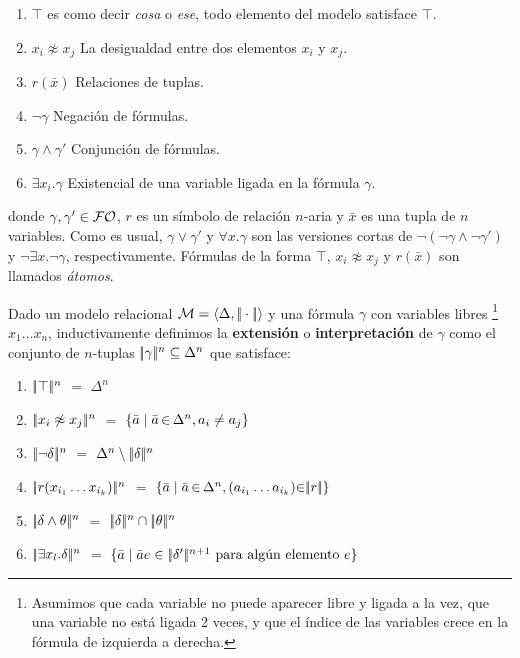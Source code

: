 \medskip

\begin{enumerate}
  \item $\top$ es como decir {\it cosa} o \emph{ese}, todo elemento del modelo satisface $\top$.
  \item $x_i \not\approx x_j$ La desigualdad entre dos elementos $x_i$ y $x_j$.
  \item $r (\bar x)$ Relaciones de tuplas.
  \item $\lnot \gamma$ Negaci\'on de f\'ormulas.
  \item $\gamma \land \gamma'$ Conjunci\'on de f\'ormulas.
  \item $\exists x_i . \gamma$ Existencial de una variable ligada en la f\'ormula $\gamma$.
\end{enumerate}
%
donde $\gamma,\gamma' \in \mathcal{FO}$,
$r$ es un s\'imbolo de relaci\'on $n$-aria y $\bar x$ es una tupla de $n$ variables.
Como es usual, $\gamma \lor \gamma'$ y $\forall x . \gamma$ son las versiones cortas de
$\lnot(\lnot\gamma \land \lnot\gamma')$ y $\lnot\exists x . \lnot\gamma$, respectivamente.
F\'ormulas de la forma $\top$, $x_i \not\approx x_j$ y $r(\bar
x)$ son llamados \emph{\'atomos}.%

Dado un modelo relacional $\mathcal{M} = \langle \Delta,|\!|\cdot|\!| \rangle$ y una
f\'ormula $\gamma$ con variables libres%
\footnote{%
    Asumimos que cada variable no puede aparecer libre y ligada a la vez, que una variable no est\'a ligada 2 veces,
    y que el \'indice de las variables crece en la f\'ormula de izquierda a derecha.%
}
$x_1\ldots x_n$, inductivamente definimos la \textbf{extensi\'on} o
\textbf{interpretaci\'on} de $\gamma$ como el conjunto de $n$-tuplas
 $|\!|\gamma|\!|^n \subseteq \Delta^n$ que satisface:

\begin{enumerate}

\item $|\!|\top|\!|^n$ $=$ $\Delta^n$

\item $|\!|x_i \not\approx x_j|\!|^n$ $=$ $\{\bar{a} \mid \bar{a} \,{\in}\, \Delta^n, a_i \neq a_j\}$

\item $|\!|\lnot\delta|\!|^n$ $=$ $\Delta^n \setminus |\!|\delta|\!|^n$

\item $|\!|r (x_{i_1} \ldots x_{i_k})|\!|^n$ $=$ $\{\bar{a} \mid \bar{a} \,{\in}\, \Delta^n, (a_{i_1} \ldots a_{i_k}) {\in} |\!|r|\!|\}$

\item $|\!|\delta \land \theta|\!|^n$ $=$ $|\!|\delta|\!|^n \cap |\!|\theta|\!|^n$

\item $|\!|\exists x_{l}.\delta|\!|^n$ $=$ $\{\bar a \mid \bar a  e  \in |\!|\delta'|\!|^{n+1}\ \text{para alg\'un elemento $e$}\}$

\end{enumerate}

